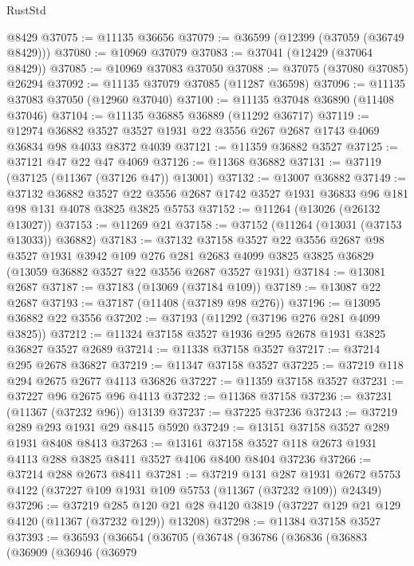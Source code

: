 \begin{lexlean}{RustStd}
\begin{coremodule}
    @8429
@37075 := @11135 @36656
@37079 := @36599 (@12399 (@37059 (@36749 @8429)))
@37080 := @10969 @37079
@37083 := @37041 (@12429 (@37064 @8429))
@37085 := @10969 @37083 @37050
@37088 := @37075 (@37080 @37085) @26294
@37092 := @11135 @37079 @37085 (@11287 @36598)
@37096 := @11135 @37083 @37050 (@12960 @37040)
@37100 := @11135 @37048 @36890 (@11408 @37046)
@37104 := @11135 @36885 @36889 (@11292 @36717)
@37119 := @12974
    @36882
    @3527
    @3527
    @1931
    @22
    @3556
    @267
    @2687
    @1743
    @4069
    @36834
    @98
    @4033
    @8372
    @4039
@37121 := @11359 @36882 @3527
@37125 := @37121 @47 @22 @47 @4069
@37126 := @11368 @36882
@37131 := @37119 (@37125 (@11367 (@37126 @47)) @13001)
@37132 := @13007 @36882
@37149 := @37132
    @36882
    @3527
    @22
    @3556
    @2687
    @1742
    @3527
    @1931
    @36833
    @96
    @181
    @98
    @131
    @4078
    @3825
    @3825
    @5753
@37152 := @11264 (@13026 (@26132 @13027))
@37153 := @11269 @21
@37158 := @37152 (@11264 (@13031 (@37153 @13033)) @36882)
@37183 := @37132
    @37158
    @3527
    @22
    @3556
    @2687
    @98
    @3527
    @1931
    @3942
    @109
    @276
    @281
    @2683
    @4099
    @3825
    @3825
    @36829
    (@13059 @36882 @3527 @22 @3556 @2687 @3527 @1931)
@37184 := @13081 @2687
@37187 := @37183 (@13069 (@37184 @109))
@37189 := @13087 @22 @2687
@37193 := @37187 (@11408 (@37189 @98 @276))
@37196 := @13095 @36882 @22 @3556
@37202 := @37193 (@11292 (@37196 @276 @281 @4099 @3825))
@37212 := @11324 @37158 @3527 @1936 @295 @2678 @1931 @3825 @36827 @3527 @2689
@37214 := @11338 @37158 @3527
@37217 := @37214 @295 @2678 @36827
@37219 := @11347 @37158 @3527
@37225 := @37219 @118 @294 @2675 @2677 @4113 @36826
@37227 := @11359 @37158 @3527
@37231 := @37227 @96 @2675 @96 @4113
@37232 := @11368 @37158
@37236 := @37231 (@11367 (@37232 @96)) @13139
@37237 := @37225 @37236
@37243 := @37219 @289 @293 @1931 @29 @8415 @5920
@37249 := @13151 @37158 @3527 @289 @1931 @8408 @8413
@37263 := @13161 @37158 @3527 @118 @2673 @1931 @4113 @288 @3825 @8411 @3527 @4106 @8400 @8404 @37236
@37266 := @37214 @288 @2673 @8411
@37281 := @37219
    @131
    @287
    @1931
    @2672
    @5753
    @4122
    (@37227 @109 @1931 @109 @5753 (@11367 (@37232 @109)) @24349)
@37296 := @37219
    @285
    @120
    @21
    @28
    @4120
    @3819
    (@37227 @129 @21 @129 @4120 (@11367 (@37232 @129)) @13208)
@37298 := @11384 @37158 @3527
@37393 := @36593
    (@36654
      (@36705
        (@36748
          (@36786
            (@36836
              (@36883
                (@36909
                  (@36946
                    (@36979

\end{coremodule}
\end{lexlean}
